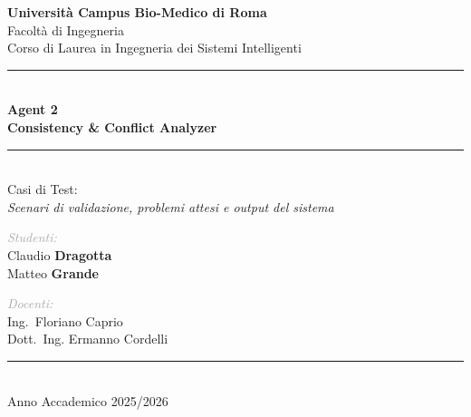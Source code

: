 \documentclass[12pt,a4paper]{report}
\begin{document}
\begin{titlepage}

  \centering
  \vspace*{0.8cm}
  {\large\textbf{\textcolor{agentblue}{Università Campus Bio-Medico di Roma}}\\[4pt]}
  {\normalsize Facoltà di Ingegneria\\[2pt]}
  {\normalsize Corso di Laurea in Ingegneria dei Sistemi Intelligenti\\}
  \vspace{3cm}
  {\color{rulecolor}\rule{0.6\textwidth}{1.5pt}}\\[0.8cm]
  {\Huge\textbf{\textcolor{agentblue}{Agent 2}}}\\[0.5cm]
  {\LARGE\textbf{\textcolor{agentdark}{Consistency \& Conflict Analyzer}}}\\[0.5cm]
  {\color{rulecolor}\rule{0.6\textwidth}{1.5pt}}\\[1cm]
  {\large Casi di Test:\\[0.3cm]
  \textit{Scenari di validazione, problemi attesi e output del sistema}}

  \vfill

  \begin{minipage}[t]{0.45\textwidth}
    {\small\textcolor{darkgray}{\textit{Studenti:}}}\\[4pt]
    Claudio \textbf{Dragotta}\\
    Matteo \textbf{Grande}
  \end{minipage}
  \hfill
  \begin{minipage}[t]{0.45\textwidth}
    \raggedleft
    {\small\textcolor{darkgray}{\textit{Docenti:}}}\\[4pt]
    Ing.\ Floriano Caprio \\
    Dott.\ Ing. Ermanno Cordelli
  \end{minipage}

  \vspace{1.5cm}
  {\color{rulecolor}\rule{0.4\textwidth}{0.8pt}}\\[6pt]
  {\normalsize Anno Accademico 2025/2026}
\end{titlepage}
\end{document}

